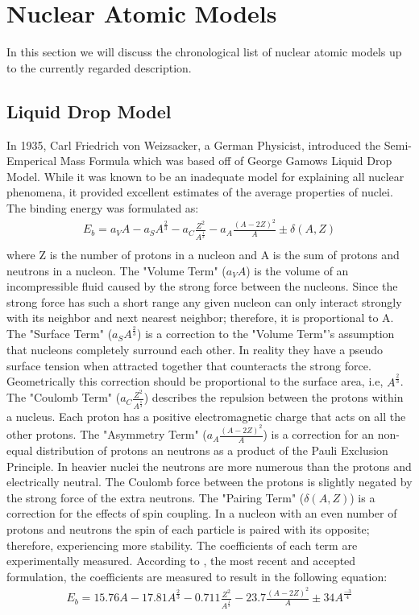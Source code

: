 \documentclass[English]{article}
\begin{document}
\section{Nuclear Atomic Models}
In this section we will discuss the chronological list of nuclear atomic models up to the currently regarded description. 

\subsection{Liquid Drop Model}
In 1935, Carl Friedrich von Weizsacker, a German Physicist, introduced the Semi-Emperical Mass Formula \cite{Carl} which was based off of George Gamows Liquid Drop Model. While it was known to be an inadequate model for explaining all nuclear phenomena, it provided excellent estimates of the average properties of nuclei. The binding energy was formulated as:
\begin{gather*}
    E_b = a_V A - a_S A^{\frac{2}{3}} - a_C \frac{Z^2}{A^{\frac{1}{3}}} - a_A \frac{(A-2Z)^2}{A} \pm \delta(A,Z)\\
\end{gather*}
where Z is the number of protons in a nucleon and A is the sum of protons and neutrons in a nucleon. 
The "Volume Term" ($a_V A$) is the volume of an incompressible fluid caused by the strong force between the nucleons. Since the strong force has such a short range any given nucleon can only interact strongly with its neighbor and next nearest neighbor; therefore, it is proportional to A. 
The "Surface Term" ($a_S A^{\frac{2}{3}}$) is a correction to the "Volume Term"'s assumption that nucleons completely surround each other. In reality they have a pseudo surface tension when attracted together that counteracts the strong force. Geometrically this correction should be proportional to the surface area, i.e, $A^{\frac{2}{3}}$.
The "Coulomb Term" ($a_C \frac{Z^2}{A^{\frac{1}{3}}}$) describes the repulsion between the protons within a nucleus. Each proton has a positive electromagnetic charge that acts on all the other protons.
The "Asymmetry Term" ($a_A \frac{(A-2Z)^2}{A}$) is a correction for an non-equal distribution of protons an neutrons as a product of the Pauli Exclusion Principle. In heavier nuclei the neutrons are more numerous than the protons and electrically neutral. The Coulomb force between the protons is slightly negated by the strong force of the extra neutrons. 
The "Pairing Term" ($\delta(A,Z)$) is a correction for the effects of spin coupling. In a nucleon with an even number of protons and neutrons the spin of each particle is paired with its opposite; therefore, experiencing more stability. 
The coefficients of each term are experimentally measured. According to \cite{ModPhys}, the most recent and accepted formulation, the coefficients are measured to result in the following equation:
\begin{gather*}
    E_b = 15.76 A - 17.81 A^{\frac{2}{3}} - 0.711 \frac{Z^2}{A^{\frac{1}{3}}} - 23.7 \frac{(A-2Z)^2}{A} \pm 34 A^{\frac{-3}{4}}\\
\end{gather*}
\end{document}
